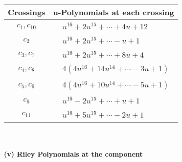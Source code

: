 \documentclass[1p]{elsarticle_modified}
\theoremstyle{definition}
\begin{document}
\begin{tabular}{m{50pt}|m{274pt}}
Crossings & \hspace{64pt}u-Polynomials at each crossing \\
\hline $$\begin{aligned}c_{1},c_{10}\end{aligned}$$&$\begin{aligned}
&u^{16}+2 u^{15}+\cdots+4 u+12
\end{aligned}$\\
\hline $$\begin{aligned}c_{2}\end{aligned}$$&$\begin{aligned}
&u^{16}+2 u^{15}+\cdots- u+1
\end{aligned}$\\
\hline $$\begin{aligned}c_{3},c_{7}\end{aligned}$$&$\begin{aligned}
&u^{16}+2 u^{15}+\cdots+8 u+4
\end{aligned}$\\
\hline $$\begin{aligned}c_{4},c_{8}\end{aligned}$$&$\begin{aligned}
&4(4 u^{16}+14 u^{14}+\cdots-3 u+1)
\end{aligned}$\\
\hline $$\begin{aligned}c_{5},c_{9}\end{aligned}$$&$\begin{aligned}
&4(4 u^{16}+10 u^{14}+\cdots-5 u+1)
\end{aligned}$\\
\hline $$\begin{aligned}c_{6}\end{aligned}$$&$\begin{aligned}
&u^{16}-2 u^{15}+\cdots+u+1
\end{aligned}$\\
\hline $$\begin{aligned}c_{11}\end{aligned}$$&$\begin{aligned}
&u^{16}+5 u^{15}+\cdots-2 u+1
\end{aligned}$\\
\hline
\end{tabular}\\~\\
\newpage\renewcommand{\arraystretch}{1}
\flushleft \textbf{(v) Riley Polynomials at the component}\newline \\
\end{document}
